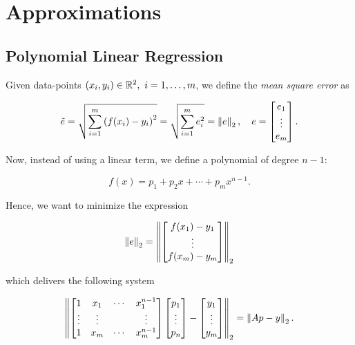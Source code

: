 \chapter{Approximations}

\section{Polynomial Linear Regression}

Given data-points \((x_i, y_i) \in \mathbb{R}^2, \ i = 1, \dots, m\), we define the \emph{mean square error} as

\[
    \tilde{e} = \sqrt{ \sum_{i = 1}^{m} {(f(x_i) - y_i)}^2 } = \sqrt{\sum_{i = 1}^{m} e_i^2} = \left\| e \right\|_2, \quad e = 
    \begin{bmatrix}
        e_1 \\ 
        \vdots \\ 
        e_m
    \end{bmatrix}.   
\]

Now, instead of using a linear term, we define a polynomial of degree \(n- 1\): 

\[
    f(x) = p_1 + p_2 x + \cdots + p_m x^{n - 1}.
\]

Hence, we want to minimize the expression 

\[
    \left\| e \right\|_2 = \left\| 
        \begin{bmatrix} 
            f(x_1) - y_1 \\ 
            \vdots \\ 
            f(x_m) - y_m
        \end{bmatrix} \right\|_2
\]

which delivers the following system 

\[
    \left\| 
        \begin{bmatrix} 
            1 & x_1 & \cdots & x_1^{n - 1} \\ 
            \vdots  & \vdots & & \vdots \\ 
            1 & x_m & \cdots & x_m^{n -1}
        \end{bmatrix}
        \begin{bmatrix}
            p_1 \\ 
            \vdots \\ 
            p_n
        \end{bmatrix} 
        -
        \begin{bmatrix}
            y_1 \\ 
            \vdots \\ 
            y_m
        \end{bmatrix}
         \right\|_2 = 
        \left\| Ap - y \right\|_2.
\]

